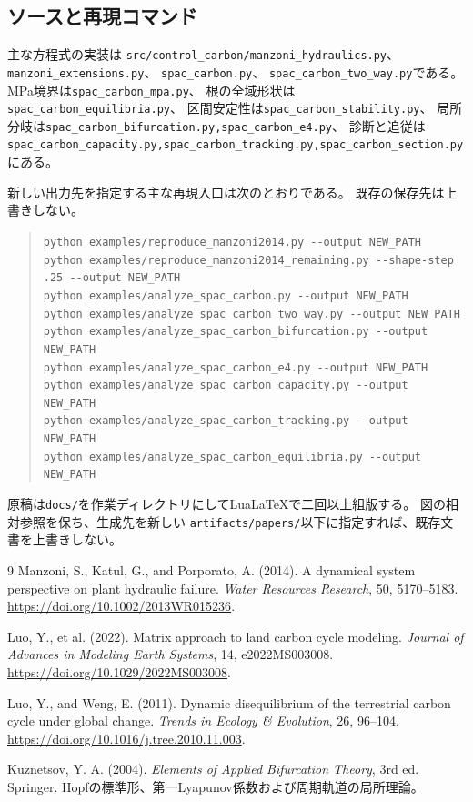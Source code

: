 \documentclass[a4paper,11pt]{ltjsarticle}
\newcommand{\code}[1]{\nolinkurl{#1}}
\begin{document}
\subsection{ソースと再現コマンド}
主な方程式の実装は
\code{src/control_carbon/manzoni_hydraulics.py}、
\code{manzoni_extensions.py}、
\code{spac_carbon.py}、
\code{spac_carbon_two_way.py}である。
MPa境界は\code{spac_carbon_mpa.py}、
根の全域形状は\code{spac_carbon_equilibria.py}、
区間安定性は\code{spac_carbon_stability.py}、
局所分岐は\code{spac_carbon_bifurcation.py,spac_carbon_e4.py}、
診断と追従は\code{spac_carbon_capacity.py,spac_carbon_tracking.py,spac_carbon_section.py}にある。

新しい出力先を指定する主な再現入口は次のとおりである。
既存の保存先は上書きしない。
\begin{quote}\small
\code{python examples/reproduce_manzoni2014.py --output NEW_PATH}\\
\code{python examples/reproduce_manzoni2014_remaining.py --shape-step .25 --output NEW_PATH}\\
\code{python examples/analyze_spac_carbon.py --output NEW_PATH}\\
\code{python examples/analyze_spac_carbon_two_way.py --output NEW_PATH}\\
\code{python examples/analyze_spac_carbon_bifurcation.py --output NEW_PATH}\\
\code{python examples/analyze_spac_carbon_e4.py --output NEW_PATH}\\
\code{python examples/analyze_spac_carbon_capacity.py --output NEW_PATH}\\
\code{python examples/analyze_spac_carbon_tracking.py --output NEW_PATH}\\
\code{python examples/analyze_spac_carbon_equilibria.py --output NEW_PATH}
\end{quote}
原稿は\code{docs/}を作業ディレクトリにしてLuaLaTeXで二回以上組版する。
図の相対参照を保ち、生成先を新しい
\code{artifacts/papers/}以下に指定すれば、既存文書を上書きしない。

\begin{thebibliography}{9}
Manzoni, S., Katul, G., and Porporato, A. (2014).
A dynamical system perspective on plant hydraulic failure.
\emph{Water Resources Research}, 50, 5170--5183.
\url{https://doi.org/10.1002/2013WR015236}.

Luo, Y., et al. (2022).
Matrix approach to land carbon cycle modeling.
\emph{Journal of Advances in Modeling Earth Systems}, 14, e2022MS003008.
\url{https://doi.org/10.1029/2022MS003008}.

Luo, Y., and Weng, E. (2011).
Dynamic disequilibrium of the terrestrial carbon cycle under global change.
\emph{Trends in Ecology \& Evolution}, 26, 96--104.
\url{https://doi.org/10.1016/j.tree.2010.11.003}.

Kuznetsov, Y. A. (2004).
\emph{Elements of Applied Bifurcation Theory}, 3rd ed.
Springer. Hopfの標準形、第一Lyapunov係数および周期軌道の局所理論。
\end{thebibliography}
\end{document}
